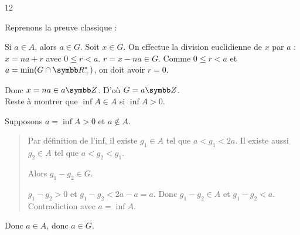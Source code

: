 \begin{correction}{12}
\begin{enumerate}
\begin{enumerate}
            Reprenons la preuve classique :

            Si $a \in A$, alors $a \in G$.
            Soit $x \in G$. On effectue la division euclidienne de $x$ par $a$ : $x = n a + r$ avec $0 \le r < a$.
            $r = x - na \in G$. Comme $0 \le r < a$ et $a = \min(G \cap \R^*_+)$, on doit avoir $r=0$.

            Donc $x = na \in a\Z$. D'où $G = a\Z$. \\


            Reste à montrer que $\inf A \in A$ si $\inf A > 0$.

            Supposons $a = \inf A > 0$ et $a \notin A$.
            \begin{quote}
                Par définition de l'inf, il existe $g_1 \in A$ tel que $a < g_1 < 2a$.
                Il existe aussi $g_2 \in A$ tel que $a < g_2 < g_1$.
                
                Alors $g_1 - g_2 \in G$.
                
                $g_1 - g_2 > 0$ et $g_1 - g_2 < 2a - a = a$.
                Donc $g_1 - g_2 \in A$ et $g_1 - g_2 < a$.
                Contradiction avec $a = \inf A$.
            \end{quote}
            Donc $a \in A$, donc $a \in G$.
    \end{enumerate}
\end{enumerate}
\end{correction}


